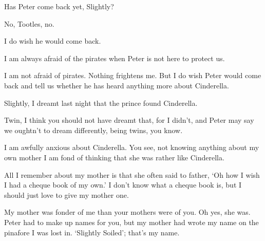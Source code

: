 \begin{drama}

\tootlesspeaks
Has Peter come back yet, Slightly?

No, Tootles, no.


I do wish he would come back.

\tootlesspeaks
I am always afraid of the pirates when Peter is not here to protect us.

\slightlyspeaks
I am not afraid of pirates.
Nothing frightens me.
But I do wish Peter would come back and tell us whether he has heard anything more about Cinderella.

Slightly, I dreamt last night that the prince found Cinderella.

Twin, I think you should not have dreamt that, for I didn’t,
and Peter may say we oughtn’t to dream differently, being twins, you know.

\tootlesspeaks
I am awfully anxious about Cinderella.
You see, not knowing anything about my own mother I am fond of thinking that she was rather like Cinderella.


\nibsspeaks
All I remember about my mother is that she often said to father, ‘Oh how I wish I had a cheque book of my own.’
I don’t know what a cheque book is, but I should just love to give my mother one.

My mother was fonder of me than your mothers were of you.
Oh yes, she was.
Peter had to make up names for you, but my mother had wrote my name on the pinafore I was lost in.
‘Slightly Soiled’; that’s my name.

\end{drama}
